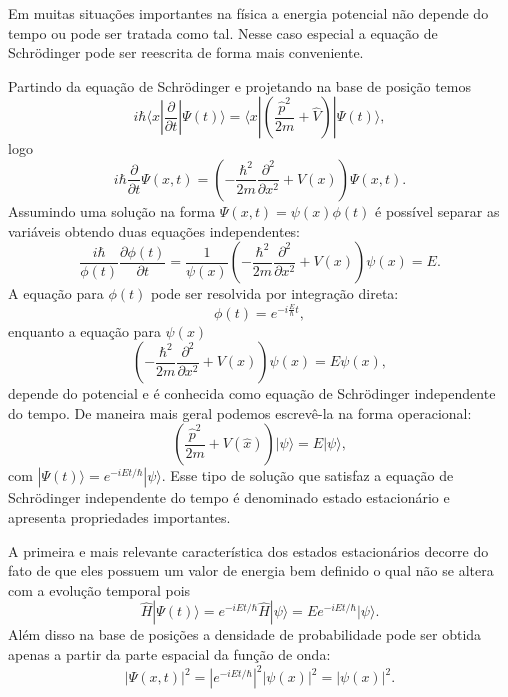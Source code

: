 Em muitas situações importantes na física a energia potencial não depende do tempo ou pode ser tratada como tal. Nesse caso especial a equação de Schrödinger pode ser reescrita de forma mais conveniente.

Partindo da equação de Schrödinger e projetando na base de posição temos
\begin{equation}
i\hbar \langle x | \frac{\partial}{\partial t}|\Psi(t)\rangle = \langle x | \left( \frac{\hat{p}^2}{2m} + \hat{V} \right) |\Psi(t)\rangle,
\end{equation}
logo
\begin{equation}
i\hbar \frac{\partial}{\partial t}\Psi(x,t) = \left( -\frac{\hbar^2}{2m}\frac{\partial^2}{\partial x^2} + V(x) \right) \Psi(x,t).
\end{equation}
Assumindo uma solução na forma $\Psi(x,t)=\psi(x)\phi(t)$ é possível separar as variáveis obtendo duas equações independentes:
\begin{equation}
\frac{i\hbar}{\phi(t)} \frac{\partial \phi(t)}{\partial t} = \frac{1}{\psi(x)} \left( -\frac{\hbar^2}{2m}\frac{\partial^2}{\partial x^2} + V(x) \right) \psi(x) = E.
\end{equation}
A equação para $\phi(t)$ pode ser resolvida por integração direta:
\begin{equation}
\phi(t) = e^{-i\frac{E}{\hbar}t},
\end{equation}
enquanto a equação para $\psi(x)$
\begin{equation}
\left( -\frac{\hbar^2}{2m}\frac{\partial^2}{\partial x^2} + V(x) \right) \psi(x) = E \psi(x),
\end{equation}
depende do potencial e é conhecida como equação de Schrödinger independente do tempo. De maneira mais geral podemos escrevê-la na forma operacional:
\begin{equation}
\left( \frac{\hat{p}^2}{2m} + V(\hat{x}) \right) |\psi\rangle = E |\psi\rangle,
\end{equation}
com $|\Psi(t)\rangle = e^{-iEt/\hbar} |\psi\rangle$. Esse tipo de solução que satisfaz a equação de Schrödinger independente do tempo é denominado estado estacionário e apresenta propriedades importantes.

A primeira e mais relevante característica dos estados estacionários decorre do fato de que eles possuem um valor de energia bem definido o qual não se altera com a evolução temporal pois
\begin{equation}
\hat{H} |\Psi(t)\rangle = e^{-iEt/\hbar} \hat{H} |\psi\rangle = E e^{-iEt/\hbar} |\psi\rangle.
\end{equation}
Além disso na base de posições a densidade de probabilidade pode ser obtida apenas a partir da parte espacial da função de onda:
\begin{equation}
|\Psi(x,t)|^2 = |e^{-iEt/\hbar}|^2 |\psi(x)|^2 = |\psi(x)|^2.
\end{equation}

